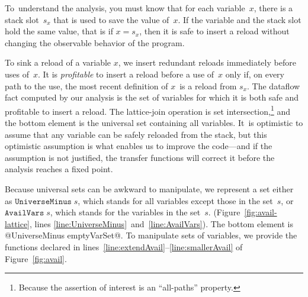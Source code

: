 \documentclass[blockstyle,preprint,nocopyrightspace]{sigplanconf}
\newcommand\linepairref[2]{lines \ref{line:#1}~and~\ref{line:#2}}
\newcommand\linerangeref[2]{\mbox{lines~\ref{line:#1}--\ref{line:#2}}}
\newcommand\slotof[1]{\ensuremath{s_{#1}}}
\newcommand\figref[1]{Figure~\ref{fig:#1}}
\begin{document}
%
%



To~understand the analysis, you must know that for each variable~$x$,
there is a stack slot~\slotof x that is used to save the value of~$x$.
%
If the variable and the stack slot hold the same value,
that is if $x = \slotof x$,
then it is safe to insert a reload without changing the observable
behavior of the program.

To sink a reload of a variable $x$, we insert redundant reloads immediately
before uses of~$x$.
It is \emph{profitable} to insert a reload before a use of~$x$ only if, 
on every path to the use, the most recent definition of $x$~is a reload from
$\slotof x$.
The dataflow fact computed by our analysis is the set of variables for
which it is both 
safe and profitable to insert a reload.
The lattice-join operation is set intersection,\footnote
{Because the assertion of interest is an ``all-paths'' property.}
and the bottom element
is the universal set containing all variables.
It~is optimistic to assume that any variable can be safely reloaded from the stack,
but this optimistic assumption is what enables us to improve the
code---and if the assumption is not justified, the transfer functions
will correct it before
the analysis reaches a fixed point.

\ifpagetuning\enlargethispage{\baselineskip}\fi

Because universal sets can be awkward to manipulate, we represent a
set either as
$\mathtt{UniverseMinus}\;s$, which stands for all variables except
those in the set~$s$,
or $\mathtt{AvailVars}\;s$, which stands for the variables in the set~$s$.
(\figref{avail-lattice}, \linepairref{UniverseMinus}{AvailVars}).
%
%
The bottom element is @UniverseMinus emptyVarSet@.
To manipulate sets of variables, we provide the functions declared in
\linerangeref{extendAvail}{smallerAvail} of \figref{avail}.



\end{document}
